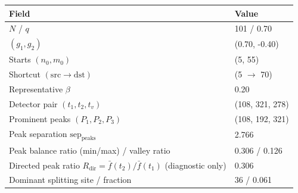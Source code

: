 \begin{tabular}{ll}
\toprule
Field & Value \\
\midrule
$N$ / $q$ & 101 / 0.70 \\
$(g_1,g_2)$ & (0.70, -0.40) \\
Starts $(n_0,m_0)$ & (5, 55) \\
Shortcut $(\mathrm{src}\to\mathrm{dst})$ & (5 $\to$ 70) \\
Representative $\beta$ & 0.20 \\
Detector pair $(t_1,t_2,t_v)$ & (108, 321, 278) \\
Prominent peaks $(P_1,P_2,P_3)$ & (108, 192, 321) \\
Peak separation $\mathrm{sep}_{\mathrm{peaks}}$ & 2.766 \\
Peak balance ratio (min/max) / valley ratio & 0.306 / 0.126 \\
Directed peak ratio $R_\mathrm{dir}=\bar f(t_2)/\bar f(t_1)$ (diagnostic only) & 0.306 \\
Dominant splitting site / fraction & 36 / 0.061 \\
\bottomrule
\end{tabular}